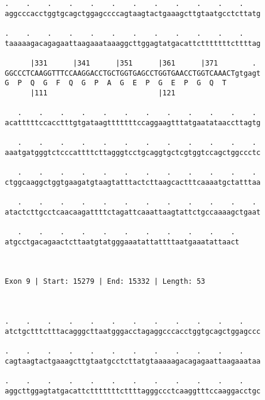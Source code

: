 \documentclass{article}
\begin{document}
\begin{Verbatim}
.    .    .    .    .    .    .    .    .    .    .    .    
aggcccacctggtgcagctggagccccagtaagtactgaaagcttgtaatgcctcttatg
                                                            
.    .    .    .    .    .    .    .    .    .    .    .    
taaaaagacagagaattaagaaataaaggcttggagtatgacattctttttttcttttag
                                                            
      |331      |341      |351      |361      |371        . 
GGCCCTCAAGGTTTCCAAGGACCTGCTGGTGAGCCTGGTGAACCTGGTCAAACTgtgagt
G  P  Q  G  F  Q  G  P  A  G  E  P  G  E  P  G  Q  T        
      |111                          |121                    
  
   .    .    .    .    .    .    .    .    .    .    .    . 
acatttttccacctttgtgataagtttttttccaggaagtttatgaatataaccttagtg
                                                            
   .    .    .    .    .    .    .    .    .    .    .    . 
aaatgatgggtctcccattttcttagggtcctgcaggtgctcgtggtccagctggccctc
                                                            
   .    .    .    .    .    .    .    .    .    .    .    . 
ctggcaaggctggtgaagatgtaagtatttactcttaagcactttcaaaatgctatttaa
                                                            
   .    .    .    .    .    .    .    .    .    .    .    . 
atactcttgcctcaacaagattttctagattcaaattaagtattctgccaaaagctgaat
                                                            
   .    .    .    .    .    .    .    .    .    .    . 
atgcctgacagaactcttaatgtatgggaaatattattttaatgaaatattaact
                                                       
                                                       
 
Exon 9 | Start: 15279 | End: 15332 | Length: 53



.    .    .    .    .    .    .    .    .    .    .    .    
atctgctttctttacagggcttaatgggacctagaggcccacctggtgcagctggagccc
                                                            
.    .    .    .    .    .    .    .    .    .    .    .    
cagtaagtactgaaagcttgtaatgcctcttatgtaaaaagacagagaattaagaaataa
                                                            
.    .    .    .    .    .    .    .    .    .    .    .    
aggcttggagtatgacattctttttttcttttagggccctcaaggtttccaaggacctgc
                                                            

\end{Verbatim}
\end{document}
